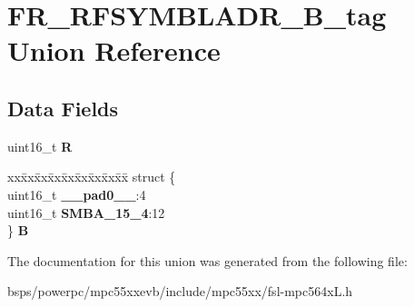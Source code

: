 \hypertarget{unionFR__RFSYMBLADR__16B__tag}{}\section{F\+R\+\_\+\+R\+F\+S\+Y\+M\+B\+L\+A\+D\+R\+\_\+B\+\_\+tag Union Reference}
\label{unionFR__RFSYMBLADR__16B__tag}
\subsection*{Data Fields}
\begin{DoxyCompactItemize}
\item 
\mbox{\label{unionFR__RFSYMBLADR__16B__tag_aafe4ebcaf4897c9002b270036d8e284a}} 
uint16\+\_\+t {\bfseries R}
\item 
\mbox{\label{unionFR__RFSYMBLADR__16B__tag_ab5741d45ee7fcf2587dd36b335d984f3}} 
\begin{tabbing}
xx\=xx\=xx\=xx\=xx\=xx\=xx\=xx\=xx\=\kill
struct \{\\
\>uint16\_t {\bfseries \_\_pad0\_\_}:4\\
\>uint16\_t {\bfseries SMBA\_15\_4}:12\\
\} {\bfseries B}\\

\end{tabbing}\end{DoxyCompactItemize}


The documentation for this union was generated from the following file\+:\begin{DoxyCompactItemize}
\item 
bsps/powerpc/mpc55xxevb/include/mpc55xx/fsl-\/mpc564x\+L.\+h\end{DoxyCompactItemize}
